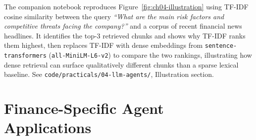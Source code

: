 \begin{illustration}
\label{ex:ch04-illustration}
The companion notebook reproduces Figure~\ref{fig:ch04-illustration} using TF-IDF
cosine similarity between the query \emph{``What are the main risk factors and
competitive threats facing the company?''} and a corpus of recent financial news
headlines. It identifies the top-3 retrieved chunks and shows why TF-IDF ranks
them highest, then replaces TF-IDF with dense embeddings from
\texttt{sentence-transformers} (\texttt{all-MiniLM-L6-v2}) to compare the
two rankings, illustrating how dense retrieval can surface qualitatively
different chunks than a sparse lexical baseline.
See \texttt{code/practicals/04-llm-agents/}, Illustration
section.
\end{illustration}


\section{Finance-Specific Agent Applications}
\label{sec:finance-apps}

